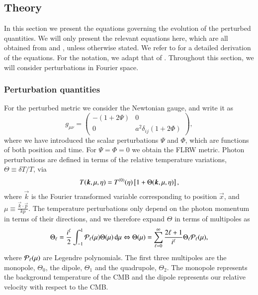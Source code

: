 \subsection{Theory}\label{ssec:M3:theory}
In this section we present the equations governing the evolution of the perturbed quantities. We will only present the relevant equations here, which are all obtained from \cite{Dodelson} and \cite{callin}, unless otherwise stated. We refer to \citeauthor{Dodelson} for a detailed derivation of the equations. For the notation, we adapt that of \citeauthor{callin}. Throughout this section, we will consider perturbations in Fourier space.  

\subsubsection{Perturbation quantities}\label{sssec:M3:theory:perturbations}
For the perturbed metric we consider the Newtonian gauge, and write it as  
\begin{equation} \label{eq:M3:theory:metric_perturbation}
    g_{\mu\nu} = 
    \begin{pmatrix}
        -(1+2\Psi) & 0 \\
        0 & a^2 \delta_{ij}(1+2\Phi)
    \end{pmatrix},
\end{equation}
where we have introduced the scalar perturbations $\Psi$ and $\Phi$, which are functions of both position and time. For $\Psi=\Phi=0$ we obtain the FLRW metric. Photon perturbations are defined in terms of the relative temperature variations, $\Theta\equiv \delta T/T$, via 
\begin{equation} \label{eq:M3:theory:temperature_fluctuations}
    T(\boldsymbol{k},\mu,\eta) = T^{(0)}(\eta)\left[ 1 + \Theta(\boldsymbol{k},\mu,\eta) \right],
\end{equation}  
where $\vec{k}$ is the Fourier transformed variable corresponding to position $\vec{x}$, and $\mu\equiv \frac{\vec{k}\cdot\vec{p}}{kp}$. The temperature perturbations only depend on the photon momentum in terms of their directions, and we therefore expand $\Theta$ in terms of multipoles as 
\begin{equation} \label{eq:M3:theory:theta_ell_multipolse_expansion}
    \Theta_\ell = \frac{i^\ell}{2}\int_{-1}^1 \mathcal{P}_\ell(\mu)\Theta(\mu)\,\dd\mu \Leftrightarrow \Theta(\mu) = \sum_{\ell=0}^{\infty}\frac{2\ell+1}{i^\ell}\Theta_\ell \mathcal{P}_\ell(\mu),
\end{equation}
where $\mathcal{P}_\ell(\mu)$ are Legendre polynomials. The first three multipoles are the monopole, $\Theta_0$, the dipole, $\Theta_1$ and the quadrupole, $\Theta_2$. The monopole represents the background temperature of the CMB and the dipole represents our relative velocity with respect to the CMB. 

